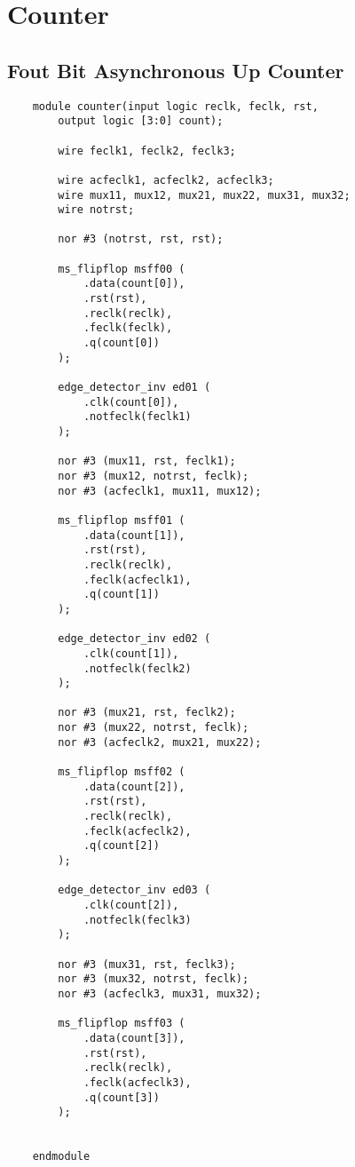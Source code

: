 \documentclass[../main]{subfiles}
\begin{document}
\section {Counter}

\subsection {Fout Bit Asynchronous Up Counter}

\begin{verbatim}
    module counter(input logic reclk, feclk, rst,
        output logic [3:0] count);

        wire feclk1, feclk2, feclk3;

        wire acfeclk1, acfeclk2, acfeclk3;
        wire mux11, mux12, mux21, mux22, mux31, mux32;
        wire notrst;

        nor #3 (notrst, rst, rst);

        ms_flipflop msff00 (
            .data(count[0]),
            .rst(rst),
            .reclk(reclk),
            .feclk(feclk),
            .q(count[0])
        );

        edge_detector_inv ed01 (
            .clk(count[0]),
            .notfeclk(feclk1)
        );

        nor #3 (mux11, rst, feclk1);
        nor #3 (mux12, notrst, feclk);
        nor #3 (acfeclk1, mux11, mux12);

        ms_flipflop msff01 (
            .data(count[1]),
            .rst(rst),
            .reclk(reclk),
            .feclk(acfeclk1),
            .q(count[1])
        );

        edge_detector_inv ed02 (
            .clk(count[1]),
            .notfeclk(feclk2)
        );

        nor #3 (mux21, rst, feclk2);
        nor #3 (mux22, notrst, feclk);
        nor #3 (acfeclk2, mux21, mux22);

        ms_flipflop msff02 (
            .data(count[2]),
            .rst(rst),
            .reclk(reclk),
            .feclk(acfeclk2),
            .q(count[2])
        );

        edge_detector_inv ed03 (
            .clk(count[2]),
            .notfeclk(feclk3)
        );

        nor #3 (mux31, rst, feclk3);
        nor #3 (mux32, notrst, feclk);
        nor #3 (acfeclk3, mux31, mux32);

        ms_flipflop msff03 (
            .data(count[3]),
            .rst(rst),
            .reclk(reclk),
            .feclk(acfeclk3),
            .q(count[3])
        );


    endmodule
\end{verbatim}
\end{document}
